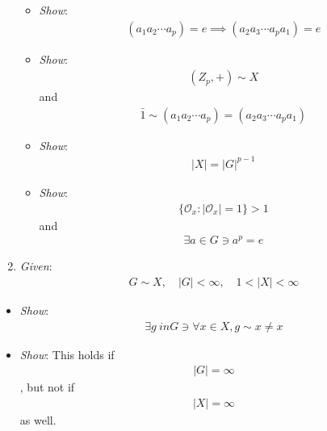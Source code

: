 \begin{enumerate}
  \begin{itemize}
  \tightlist
  \item
    \emph{Show}:
    \begin{align*}(a_1 a_2\cdots a_p) = e \implies (a_2 a_3 \cdots a_p a_1) = e\end{align*}
  \item
    \emph{Show}: \begin{align*}(Z_p, +) \sim X\end{align*} and
    \begin{align*}\bar 1 \sim (a_1 a_2 \cdots a_p) = (a_2 a_3 \cdots a_p a_1)\end{align*}
  \item
    \emph{Show}: \begin{align*}|X| = |G|^{p-1}\end{align*}
  \item
    \emph{Show}:
    \begin{align*}\{ \mathcal{O}_x : |\mathcal{O}_x| = 1 \} > 1\end{align*}
    and \begin{align*}\exists a \in G \ni a^p = e\end{align*}
  \end{itemize}
\item
  \emph{Given}:
  \begin{align*}G \sim X, \quad |G| < \infty , \quad 1 < |X| < \infty\end{align*}
\end{enumerate}

\begin{itemize}
\tightlist
\item
  \emph{Show}:
  \begin{align*}\exists g\ in G \ni \forall x\in X, g\sim x \neq x\end{align*}
\item
  \emph{Show}: This holds if \begin{align*}|G| = \infty\end{align*}, but
  not if \begin{align*}|X| = \infty\end{align*} as well.
\end{itemize}

